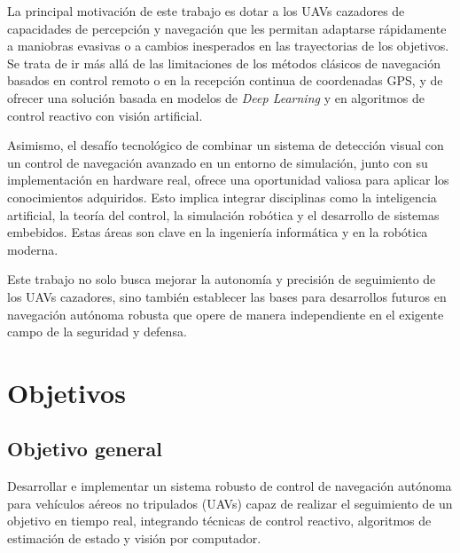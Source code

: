 \vspace{0.4cm}

La principal motivación de este trabajo es dotar a los UAVs cazadores de capacidades de percepción y navegación que les permitan adaptarse rápidamente a maniobras evasivas o a cambios inesperados en las trayectorias de los objetivos. Se trata de ir más allá de las limitaciones de los métodos clásicos de navegación basados en control remoto o en la recepción continua de coordenadas GPS, y de ofrecer una solución basada en modelos de \textit{Deep Learning} y en algoritmos de control reactivo con visión artificial.

\vspace{0.4cm}

Asimismo, el desafío tecnológico de combinar un sistema de detección visual con un control de navegación avanzado en un entorno de simulación, junto con su implementación en hardware real, ofrece una oportunidad valiosa para aplicar los conocimientos adquiridos. Esto implica integrar disciplinas como la inteligencia artificial, la teoría del control, la simulación robótica y el desarrollo de sistemas embebidos. Estas áreas son clave en la ingeniería informática y en la robótica moderna.

\vspace{0.4cm}

Este trabajo no solo busca mejorar la autonomía y precisión de seguimiento de los UAVs cazadores, sino también establecer las bases para desarrollos futuros en navegación autónoma robusta que opere de manera independiente en el exigente campo de la seguridad y defensa.

\section{Objetivos}

\subsection{Objetivo general}

\vspace{0.4cm}
Desarrollar e implementar un sistema robusto de control de navegación autónoma para vehículos aéreos no tripulados (UAVs) capaz de realizar el seguimiento de un objetivo en tiempo real, integrando técnicas de control reactivo, algoritmos de estimación de estado y visión por computador.


\vspace{0.6cm}

